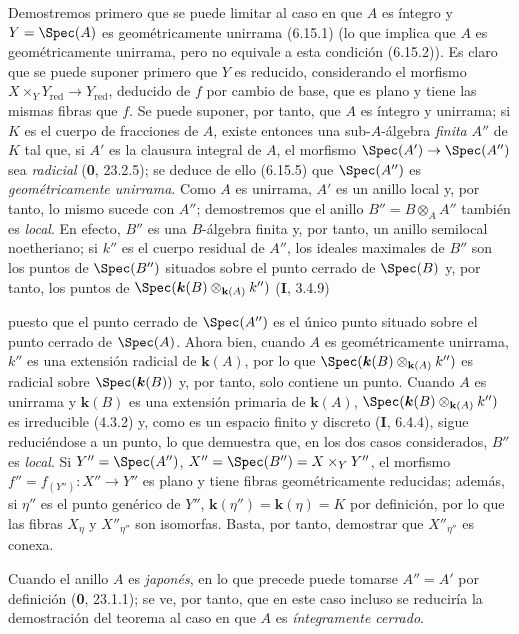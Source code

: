 Demostremos primero que se puede limitar al caso en que $A$ es íntegro y $Y=\Spec(A)$ es geométricamente unirrama (6.15.1) (lo que implica que $A$ es geométricamente unirrama, pero no equivale a esta condición (6.15.2)). Es claro que se puede suponer primero que $Y$ es reducido, considerando el morfismo $X\times_Y Y_{\mathrm{red}}\to Y_{\mathrm{red}}$, deducido de $f$ por cambio de base, que es plano y tiene las mismas fibras que $f$. Se puede suponer, por tanto, que $A$ es íntegro y unirrama; si $K$ es el cuerpo de fracciones de $A$, existe entonces una sub-$A$-álgebra \emph{finita} $A''$ de $K$ tal que, si $A'$ es la clausura integral de $A$, el morfismo $\Spec(A')\to\Spec(A'')$ sea \emph{radicial} (\textbf 0, 23.2.5); se deduce de ello (6.15.5) que $\Spec(A'')$ es \emph{geométricamente unirrama}. Como $A$ es unirrama, $A'$ es un anillo local y, por tanto, lo mismo sucede con $A''$; demostremos que el anillo $B''=B\otimes_A A''$ también es \emph{local}. En efecto, $B''$ es una $B$-álgebra finita y, por tanto, un anillo semilocal noetheriano; si $k''$ es el cuerpo residual de $A''$, los ideales maximales de $B''$ son los puntos de $\Spec(B'')$ situados sobre el punto cerrado de $\Spec(B)$ y, por tanto, los puntos de $\Spec(\boldsymbol{k}(B)\otimes_{\mathbf{k}(A)}k'')$ (\textbf I, 3.4.9)


puesto que el punto cerrado de $\Spec(A'')$ es el único punto situado sobre el punto cerrado de $\Spec(A)$. Ahora bien, cuando $A$ es geométricamente unirrama, $k''$ es una extensión radicial de $\boldsymbol{k}(A)$, por lo que $\Spec(\boldsymbol{k}(B)\otimes_{\mathbf{k}(A)}k'')$ es radicial sobre $\Spec(\boldsymbol{k}(B))$ y, por tanto, solo contiene un punto. Cuando $A$ es unirrama y $\boldsymbol{k}(B)$ es una extensión primaria de $\boldsymbol{k}(A)$, $\Spec(\boldsymbol{k}(B)\otimes_{\mathbf{k}(A)}k'')$ es irreducible (4.3.2) y, como es un espacio finito y discreto (\textbf I, 6.4.4), sigue reduciéndose a un punto, lo que demuestra que, en los dos casos considerados, $B''$ es \emph{local}. Si $Y''=\Spec(A'')$, $X''=\Spec(B'')=X\times_Y Y''$, el morfismo $f''=f_{(Y'')}:X''\to Y''$ es plano y tiene fibras geométricamente reducidas; además, si $\eta''$ es el punto genérico de $Y''$, $\boldsymbol{k}(\eta'')=\boldsymbol{k}(\eta)=K$ por definición, por lo que las fibras $X_\eta$ y $X''_{\eta''}$ son isomorfas. Basta, por tanto, demostrar que $X''_{\eta''}$ es conexa.

\begin{remark}[18.9.7.1]
\label{IV.18.9.7.1}
Cuando el anillo $A$ es \emph{japonés}, en lo que precede puede tomarse $A''=A'$ por definición (\textbf 0, 23.1.1); se ve, por tanto, que en este caso incluso se reduciría la demostración del teorema al caso en que $A$ es \emph{íntegramente cerrado}.
\end{remark}


